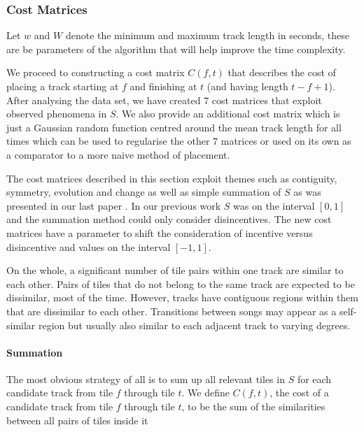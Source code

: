 \documentclass[twocolumn]{article}
\begin{document}
	\subsubsection{Cost Matrices}\label{sec:cost-matrices}
	
	Let $w$ and $W$ denote the minimum and maximum track length in seconds, these are be parameters of the algorithm that will help improve the time complexity. 
	
We proceed to constructing a cost matrix $C(f,t)$ that describes the
cost of placing a track starting at $f$ and finishing at $t$ (and
having length $t-f+1$). After analysing the data set, we have created
$7$ cost matrices that exploit observed phenomena in $S$. We also
provide an additional cost matrix which is just a Gaussian random
function centred around the mean track length for all times which can
be used to regularise the other $7$ matrices or used on its own as a
comparator to a more naive method of placement.
	
	The cost matrices described in this section exploit themes such as contiguity, symmetry, evolution and change as well as simple summation of $S$ as was presented in our last paper \citep{scarfe2013long}. In our previous work $S$ was on the interval $[0,1]$ and the summation method could only consider disincentives. The new cost matrices have a parameter to shift the consideration of incentive versus disincentive and values on the interval $[-1,1]$.
	
	On the whole, a significant number of tile pairs within one track are similar to each other. Pairs of tiles that do not belong to the same track are expected to be dissimilar, most of the time. However, tracks have contiguous regions within them that are dissimilar to each other. Transitions between songs may appear as a self-similar region but usually also similar to each adjacent track to varying degrees.  
	
	\paragraph{Summation}
	
	The most obvious strategy of all is to sum up all relevant tiles in $S$ for each candidate track from tile $f$ through tile $t$. We define $C(f,t)$, the cost of a candidate track from tile $f$ through tile $t$, to be the sum of the similarities between all pairs of tiles inside it
\end{document}
